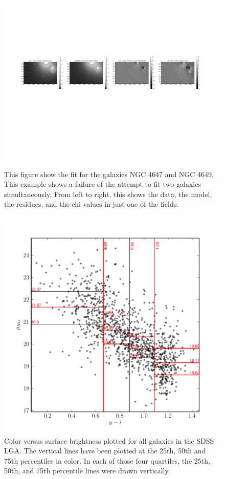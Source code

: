 \documentclass[12pt,preprint,pdftex]{aastex}
\begin{document}
\begin{figure}
\centering
\includegraphics[trim = .9cm 4.5cm 1.15cm 2.9cm,clip=true,width=\textwidth] {baddouble.pdf}
\caption{This figure show the fit for the galaxies NGC 4647 and NGC
 4649. This example shows a failure of the attempt to fit two galaxies
 simultaneously. From left to right, this shows the data, the model,
 the residues, and the chi values in just one of the fields.}
\label{fig:baddouble}
\end{figure}

\begin{figure}
\centering
\includegraphics[trim=0mm 0mm 0mm 10mm]{quartiles.pdf}
\caption{Color versus surface brightness plotted for all galaxies in the SDSS LGA. The vertical lines have been plotted at the 25th, 50th and 75th percentiles in color. In each of those four quartiles, the 25th, 50th, and 75th percentile lines were drawn vertically.}
\label{fig:quartiles}
\end{figure}
\end{document}
